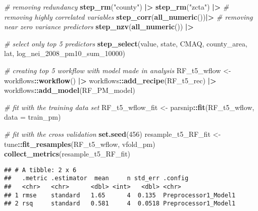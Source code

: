 \documentclass[
]{article}
\newenvironment{Shaded}{\begin{snugshade}}{\end{snugshade}}
\newcommand{\AttributeTok}[1]{\textcolor[rgb]{0.13,0.29,0.53}{#1}}
\newcommand{\CommentTok}[1]{\textcolor[rgb]{0.56,0.35,0.01}{\textit{#1}}}
\newcommand{\DecValTok}[1]{\textcolor[rgb]{0.00,0.00,0.81}{#1}}
\newcommand{\FunctionTok}[1]{\textcolor[rgb]{0.13,0.29,0.53}{\textbf{#1}}}
\newcommand{\NormalTok}[1]{#1}
\newcommand{\OtherTok}[1]{\textcolor[rgb]{0.56,0.35,0.01}{#1}}
\newcommand{\SpecialCharTok}[1]{\textcolor[rgb]{0.81,0.36,0.00}{\textbf{#1}}}
\newcommand{\StringTok}[1]{\textcolor[rgb]{0.31,0.60,0.02}{#1}}
\begin{document}
\begin{Shaded}
\begin{Highlighting}[]
    \CommentTok{\# removing redundancy}
    \FunctionTok{step\_rm}\NormalTok{(}\StringTok{"county"}\NormalTok{) }\SpecialCharTok{|\textgreater{}}
    \FunctionTok{step\_rm}\NormalTok{(}\StringTok{"zcta"}\NormalTok{) }\SpecialCharTok{|\textgreater{}}
    \CommentTok{\# removing highly correlated variables}
    \FunctionTok{step\_corr}\NormalTok{(}\FunctionTok{all\_numeric}\NormalTok{())}\SpecialCharTok{|\textgreater{}}
    \CommentTok{\# removing near zero variance predictors}
    \FunctionTok{step\_nzv}\NormalTok{(}\FunctionTok{all\_numeric}\NormalTok{()) }\SpecialCharTok{|\textgreater{}}
    
    \CommentTok{\# select only top 5 predictors}
    \FunctionTok{step\_select}\NormalTok{(value, state, CMAQ, county\_area, lat, log\_nei\_2008\_pm10\_sum\_10000)}

\CommentTok{\# creating top 5 workflow with model made in analysis}
\NormalTok{RF\_t5\_wflow }\OtherTok{\textless{}{-}}\NormalTok{ workflows}\SpecialCharTok{::}\FunctionTok{workflow}\NormalTok{() }\SpecialCharTok{|\textgreater{}}
\NormalTok{  workflows}\SpecialCharTok{::}\FunctionTok{add\_recipe}\NormalTok{(RF\_t5\_rec) }\SpecialCharTok{|\textgreater{}}
\NormalTok{  workflows}\SpecialCharTok{::}\FunctionTok{add\_model}\NormalTok{(RF\_PM\_model)}

\CommentTok{\# fit with the training data set}
\NormalTok{RF\_t5\_wflow\_fit }\OtherTok{\textless{}{-}}\NormalTok{ parsnip}\SpecialCharTok{::}\FunctionTok{fit}\NormalTok{(RF\_t5\_wflow, }\AttributeTok{data =}\NormalTok{ train\_pm)}

\CommentTok{\# fit with the cross validation }
\FunctionTok{set.seed}\NormalTok{(}\DecValTok{456}\NormalTok{)}
\NormalTok{resample\_t5\_RF\_fit }\OtherTok{\textless{}{-}}\NormalTok{ tune}\SpecialCharTok{::}\FunctionTok{fit\_resamples}\NormalTok{(RF\_t5\_wflow, vfold\_pm)}
\FunctionTok{collect\_metrics}\NormalTok{(resample\_t5\_RF\_fit)}
\end{Highlighting}
\end{Shaded}

\begin{verbatim}
## # A tibble: 2 x 6
##   .metric .estimator  mean     n std_err .config             
##   <chr>   <chr>      <dbl> <int>   <dbl> <chr>               
## 1 rmse    standard   1.65      4  0.135  Preprocessor1_Model1
## 2 rsq     standard   0.581     4  0.0518 Preprocessor1_Model1
\end{verbatim}
\end{document}

